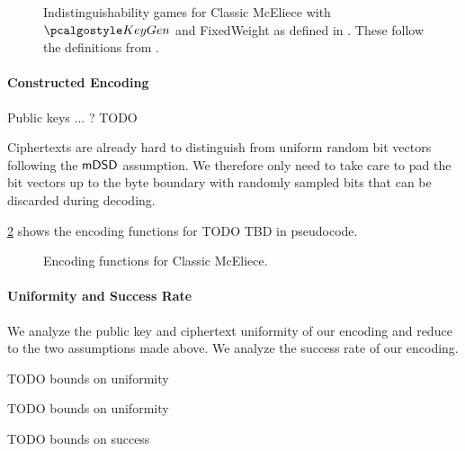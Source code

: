 \begin{figure}
    
    \caption{Indistinguishability games for Classic McEliece with $\kgen$ and \textsf{FixedWeight} as defined in \cite{NISTPQC-R4:ClassicMcEliece22}. These follow the definitions from \cite[Definition~K.1]{EC:Xagawa22}.}
    \label{fig:classic-mceliece-assumptions}
\end{figure}

\paragraph{Constructed Encoding}

Public keys ... ? TODO

Ciphertexts are already hard to distinguish from uniform random bit vectors following the $\mathsf{mDSD}$ assumption. We therefore only need to take care to pad the bit vectors up to the byte boundary with randomly sampled bits that can be discarded during decoding.

\cref{fig:classic-mceliece-encoding} shows the encoding functions for TODO TBD in pseudocode.

\begin{figure}
    
    \caption{Encoding functions for Classic McEliece.}
    \label{fig:classic-mceliece-encoding}
\end{figure}

\paragraph{Uniformity and Success Rate}

We analyze the public key and ciphertext uniformity of our encoding and reduce to the two assumptions made above. We analyze the success rate of our encoding.

\begin{lemma} \label{lem:classic-mceliece-pk-unif}
    TODO bounds on uniformity
\end{lemma}

\begin{lemma} \label{lem:classic-mceliece-ctxt-unif}
    TODO bounds on uniformity
\end{lemma}

\begin{lemma} \label{lem:classic-mceliece-first-keygen-success}
    TODO bounds on success
\end{lemma}

